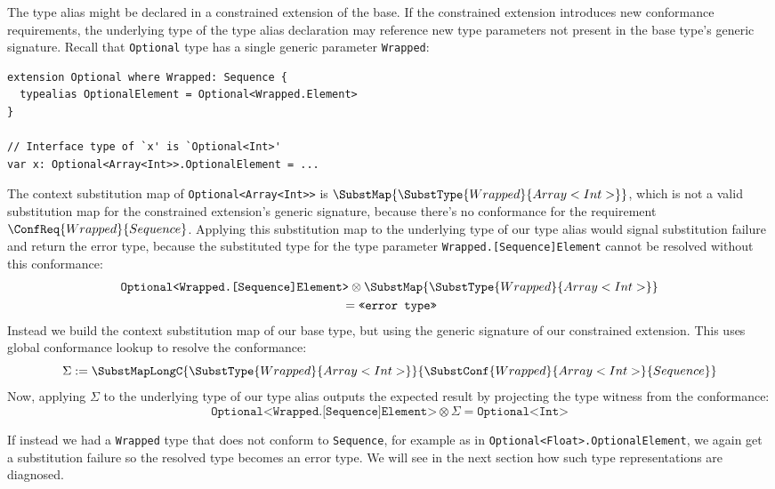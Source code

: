 \documentclass[../generics]{subfiles}
\begin{document}
The type alias might be declared in a constrained extension of the base. If the constrained extension introduces new conformance requirements, the underlying type of the type alias declaration may reference new type parameters not present in the base type's generic signature. Recall that \texttt{Optional} type has a single generic parameter \texttt{Wrapped}:
\begin{Verbatim}
extension Optional where Wrapped: Sequence {
  typealias OptionalElement = Optional<Wrapped.Element>
}

// Interface type of `x' is `Optional<Int>'
var x: Optional<Array<Int>>.OptionalElement = ...
\end{Verbatim}
The context substitution map of \texttt{Optional<Array<Int>>} is $\SubstMap{\SubstType{Wrapped}{Array<Int>}}$, which is not a valid substitution map for the constrained extension's generic signature, because there's no conformance for the requirement $\ConfReq{Wrapped}{Sequence}$. Applying this substitution map to the underlying type of our type alias would signal substitution failure and return the error type, because the substituted type for the type parameter \texttt{Wrapped.[Sequence]Element} cannot be resolved without this conformance:
\begin{multline*}\texttt{Optional<Wrapped.[Sequence]Element>}\otimes\SubstMap{\SubstType{Wrapped}{Array<Int>}}\\
{} =\texttt{<<error type>>}
\end{multline*}
Instead we build the context substitution map of our base type, but using the generic signature of our constrained extension. This uses global conformance lookup to resolve the conformance:
\[\Sigma := \SubstMapLongC{\SubstType{Wrapped}{Array<Int>}}{\SubstConf{Wrapped}{Array<Int>}{Sequence}}\]
Now, applying $\Sigma$ to the underlying type of our type alias outputs the expected result by projecting the type witness from the conformance:
\[\texttt{Optional<Wrapped.[Sequence]Element>}\otimes\Sigma = \texttt{Optional<Int>}\]

If instead we had a \texttt{Wrapped} type that does not conform to \texttt{Sequence}, for example as in \texttt{Optional<Float>.OptionalElement}, we again get a substitution failure so the resolved type becomes an error type. We will see in the next section how such type representations are diagnosed.

\smallskip
\end{document}
